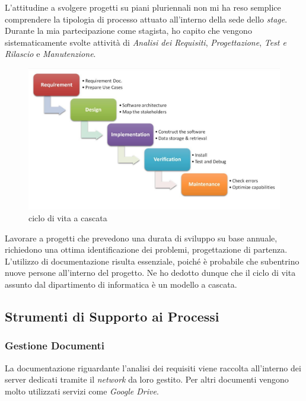 L'attitudine a svolgere progetti su piani pluriennali non mi ha reso semplice comprendere la tipologia di processo attuato all'interno della sede dello \textit{stage}. Durante la mia partecipazione come stagista, ho capito che vengono sistematicamente svolte attività di \textit{Analisi dei Requisiti}, \textit{Progettazione}, \textit{Test e Rilascio} e \textit{Manutenzione}. 
\begin{figure}[htbp]

	\includegraphics[scale=0.3]{./capitoli/capitolo1/img/cascata}
	\caption{ciclo di vita a cascata}

\end{figure}

Lavorare a progetti che prevedono una durata di sviluppo su base annuale, richiedono una ottima identificazione dei problemi, progettazione di partenza. L'utilizzo di documentazione risulta essenziale, poiché è probabile che subentrino nuove persone all'interno del progetto.
Ne ho dedotto dunque che il ciclo di vita assunto dal dipartimento di informatica è un modello a cascata.


\subsection{Strumenti di Supporto ai Processi}

\subsubsection{Gestione Documenti}
La documentazione riguardante l'analisi dei requisiti viene raccolta all'interno dei server dedicati tramite il \textit{network} da loro gestito. Per altri documenti vengono molto utilizzati servizi come \textit{Google Drive}. 
 


